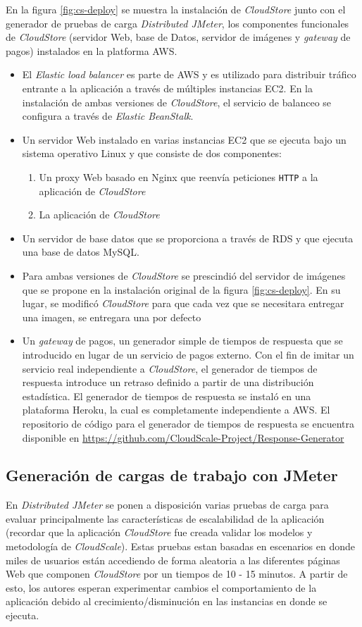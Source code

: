 \documentclass[11pt, twoside]{report}
\begin{document}
En la figura \ref{fig:cs-deploy} se muestra la instalación de \emph{CloudStore} junto con el generador de pruebas de carga \emph{Distributed JMeter}, los componentes funcionales de \emph{CloudStore} (servidor Web, base de Datos, servidor de imágenes y \emph{gateway} de pagos) instalados en la platforma AWS.
\begin{itemize}
    \item El \emph{Elastic load balancer} es parte de AWS y es utilizado para distribuir tráfico entrante a la aplicación a través de múltiples instancias EC2. En la instalación de ambas versiones de \emph{CloudStore}, el servicio de balanceo se configura a través de \emph{Elastic BeanStalk}.
    \item Un servidor Web instalado en varias instancias EC2 que se ejecuta bajo un sistema operativo Linux y que consiste de dos componentes:
    \begin{enumerate}
        \item Un proxy Web basado en Nginx que reenvía peticiones \texttt{HTTP} a la aplicación de \emph{CloudStore}
        \item La aplicación de \emph{CloudStore}
    \end{enumerate}
    \item Un servidor de base datos que se proporciona a través de RDS y que ejecuta una base de datos MySQL.
    \item Para ambas versiones de \emph{CloudStore} se prescindió del servidor de imágenes que se propone en la instalación original de la figura \ref{fig:cs-deploy}. En su lugar, se modificó \emph{CloudStore} para que cada vez que se necesitara entregar una imagen, se entregara una por defecto
    \item Un \emph{gateway} de pagos, un generador simple de tiempos de respuesta que se introducido en lugar de un servicio de pagos externo. Con el fin de imitar un servicio real independiente a \emph{CloudStore}, el generador de tiempos de respuesta introduce un retraso definido a partir de una distribución estadística. El generador de tiempos de respuesta se instaló en una plataforma Heroku, la cual es completamente independiente a AWS. El repositorio de código para el generador de tiempos de respuesta se encuentra disponible en \url{https://github.com/CloudScale-Project/Response-Generator}
\end{itemize}
  

\subsection{Generación de cargas de trabajo con JMeter}
En \emph{Distributed JMeter} se ponen a disposición varias pruebas de carga para evaluar principalmente las características de escalabilidad de la aplicación (recordar que la aplicación \emph{CloudStore} fue creada validar los modelos y metodología de \emph{CloudScale}). Estas pruebas estan basadas en escenarios en donde miles de usuarios están accediendo de forma aleatoria a las diferentes páginas Web que componen \emph{CloudStore} por un tiempos de 10 - 15 minutos. A partir de esto, los autores esperan experimentar cambios el comportamiento de la aplicación debido al crecimiento/disminución en las instancias en donde se ejecuta.
\end{document}
